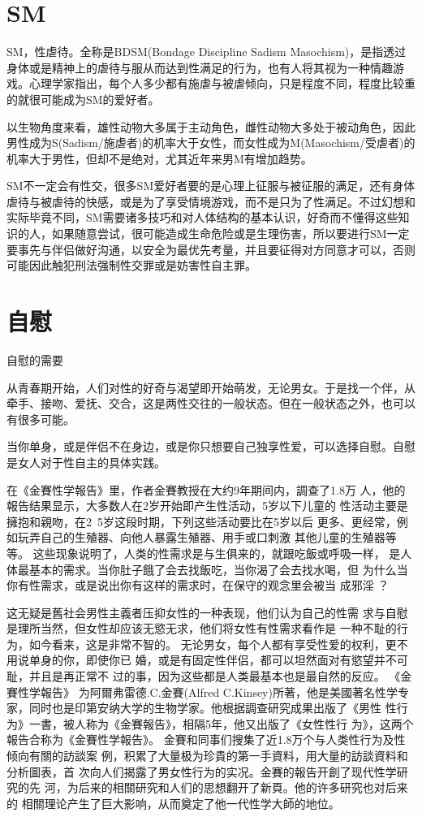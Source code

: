\documentclass[12pt,UTF8]{ctexbook}
\begin{document}
\chapter{SM}

SM，性虐待。全称是BDSM(Bondage Discipline Sadism Masochism)，是指透过身体或是精神上的虐待与服从而达到性满足的行为，也有人将其视为一种情趣游戏。心理学家指出，每个人多少都有施虐与被虐倾向，只是程度不同，程度比较重的就很可能成为SM的爱好者。

以生物角度来看，雄性动物大多属于主动角色，雌性动物大多处于被动角色，因此男性成为S(Sadism/施虐者)的机率大于女性，而女性成为M(Masochism/受虐者)的机率大于男性，但却不是绝对，尤其近年来男M有增加趋势。

SM不一定会有性交，很多SM爱好者要的是心理上征服与被征服的满足，还有身体虐待与被虐待的快感，或是为了享受情境游戏，而不是只为了性满足。不过幻想和实际毕竟不同，SM需要诸多技巧和对人体结构的基本认识，好奇而不懂得这些知识的人，如果随意尝试，很可能造成生命危险或是生理伤害，所以要进行SM一定要事先与伴侣做好沟通，以安全为最优先考量，并且要征得对方同意才可以，否则可能因此触犯刑法强制性交罪或是妨害性自主罪。

\chapter{自慰}

自慰的需要

从青春期开始，人们对性的好奇与渴望即开始萌发，无论男女。于是找一个伴，从牵手、接吻、爱抚、交合，这是两性交往的一般状态。但在一般状态之外，也可以有很多可能。

当你单身，或是伴侣不在身边，或是你只想要自己独享性爱，可以选择自慰。自慰是女人对于性自主的具体实践。

在《金賽性学報告》里，作者金賽教授在大约9年期间内，調查了1.8万
人，他的報告结果显示，大多数人在2岁开始即产生性活动，5岁以下儿童的
性活动主要是擁抱和親吻，在2~5岁这段时期，下列这些活动要比在5岁以后
更多、更经常，例如玩弄自己的生殖器、向他人暴露生殖器、用手或口刺激
其他儿童的生殖器等等。
这些现象说明了，人类的性需求是与生俱来的，就跟吃飯或呼吸一样，
是人体最基本的需求。当你肚子餓了会去找飯吃，当你渴了会去找水喝，但
为什么当你有性需求，或是说出你有这样的需求时，在保守的观念里会被当
成邪淫 ？

这无疑是舊社会男性主義者压抑女性的一种表现，他们认为自己的性需
求与自慰是理所当然，但女性却应该无慾无求，他们将女性有性需求看作是
一种不耻的行为，如今看来，这是非常不智的。
无论男女，每个人都有享受性爱的权利，更不用说单身的你，即使你已
婚，或是有固定性伴侣，都可以坦然面对有慾望并不可耻，并且是再正常不
过的事，因为这些都是人类最基本也是最自然的反应。
《金賽性学報告》
为阿爾弗雷德.C.金賽(Alfred C.Kinsey)所著，他是美國著名性学专
家，同时也是印第安纳大学的生物学家。他根据調查研究成果出版了《男性
性行为》一書，被人称为《金賽報告》，相隔5年，他又出版了《女性性行
为》，这两个報告合称为《金賽性学報告》。
金賽和同事们搜集了近1.8万个与人类性行为及性倾向有關的訪談案
例，积累了大量极为珍貴的第一手資料，用大量的訪談資料和分析圖表，首
次向人们揭露了男女性行为的实况。金賽的報告开創了现代性学研究的先
河，为后来的相關研究和人们的思想翻开了新頁。他的许多研究也对后来的
相關理论产生了巨大影响，从而奠定了他一代性学大師的地位。
\end{document}
